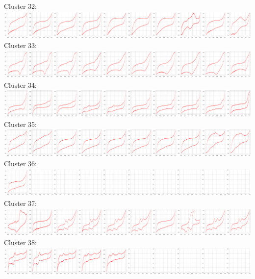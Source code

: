 Cluster 32:\\
\includegraphics[width=1.0\textwidth]{figures/clusters/cv_cluster32.png}
Cluster 33:\\
\includegraphics[width=1.0\textwidth]{figures/clusters/cv_cluster33.png}
Cluster 34:\\
\includegraphics[width=1.0\textwidth]{figures/clusters/cv_cluster34.png}
Cluster 35:\\
\includegraphics[width=1.0\textwidth]{figures/clusters/cv_cluster35.png}
Cluster 36:\\
\includegraphics[width=1.0\textwidth]{figures/clusters/cv_cluster36.png}
Cluster 37:\\
\includegraphics[width=1.0\textwidth]{figures/clusters/cv_cluster37.png}
Cluster 38:\\
\includegraphics[width=1.0\textwidth]{figures/clusters/cv_cluster38.png}

